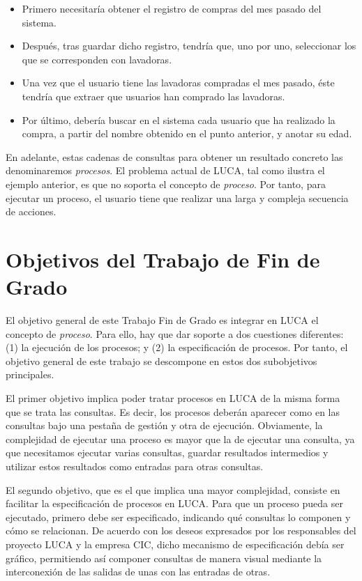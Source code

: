 \begin{itemize}
	\item Primero necesitaría obtener el registro de compras del mes pasado del sistema.
	\item Después, tras guardar dicho registro, tendría que, uno por uno, seleccionar los que se corresponden con lavadoras.
	\item Una vez que el usuario tiene las lavadoras compradas el mes pasado, éste tendría que extraer que usuarios han comprado las lavadoras.
	\item Por último, debería buscar en el sistema cada usuario que ha realizado la compra, a partir del nombre obtenido en el punto anterior, y anotar su edad.
\end{itemize}

En adelante, estas cadenas de consultas para obtener un resultado concreto las denominaremos \emph{procesos}. El problema actual de LUCA, tal como ilustra el ejemplo anterior, es que no soporta el concepto de \emph{proceso}. Por tanto, para ejecutar un proceso,  el usuario tiene que realizar una larga y compleja secuencia de acciones.

\section{Objetivos del Trabajo de Fin de Grado}

El objetivo general de este Trabajo Fin de Grado es integrar en LUCA el concepto de \emph{proceso}. Para ello, hay que dar soporte a dos cuestiones diferentes: (1) la ejecución de los procesos; y (2) la especificación de procesos. Por tanto, el objetivo general de este trabajo se descompone en estos dos subobjetivos principales. 

El primer objetivo implica poder tratar procesos en LUCA de la misma forma que se trata las consultas. Es decir, los procesos deberán aparecer como en las consultas bajo una pestaña de gestión y otra de ejecución. Obviamente, la complejidad de ejecutar una proceso es mayor que la de ejecutar una consulta, ya que necesitamos ejecutar varias consultas, guardar resultados intermedios y utilizar estos resultados como entradas para otras consultas.

El segundo objetivo, que es el que implica una mayor complejidad, consiste en facilitar la especificación de procesos en LUCA. Para que un proceso pueda ser ejecutado, primero debe ser especificado, indicando qué consultas lo componen y cómo se relacionan. De acuerdo con los deseos expresados por los responsables del proyecto LUCA y la empresa CIC, dicho mecanismo de especificación debía ser gráfico, permitiendo así componer consultas de manera visual mediante la interconexión de las salidas de unas con las entradas de otras.

